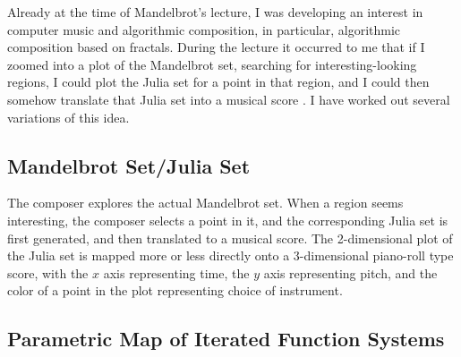\documentclass[11pt]{scrartcl}
\begin{document}
Already at the time of Mandelbrot's lecture, I was developing an interest in computer music and algorithmic composition, in particular, algorithmic composition based on fractals. During the lecture it occurred to me that if I zoomed into a plot of the Mandelbrot set, searching for interesting-looking regions, I could plot the Julia set for a point in that region, and I could then somehow translate that Julia set into a musical score \parencite{obsessed}. I have worked out several variations of this idea.

\subsection*{Mandelbrot Set/Julia Set}

The composer explores the actual Mandelbrot set. When a region seems interesting, the composer selects a point in it, and the corresponding Julia set is first generated, and then translated to a musical score. The 2-dimensional plot of the Julia set is mapped more or less directly onto a 3-dimensional piano-roll type score, with the $x$ axis representing time, the $y$ axis representing pitch, and the color of a point in the plot representing choice of instrument.

\subsection*{Parametric Map of Iterated Function Systems}
\end{document}
